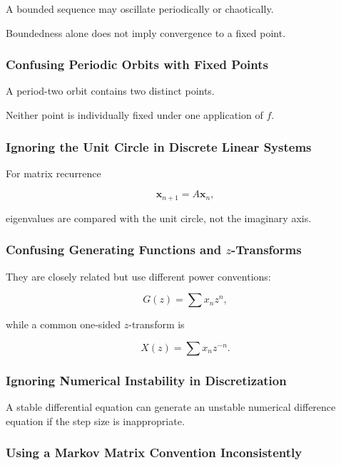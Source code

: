 A bounded sequence may oscillate periodically or chaotically.

Boundedness alone does not imply convergence to a fixed point.

\subsubsection{Confusing Periodic Orbits with Fixed Points}

A period-two orbit contains two distinct points.

Neither point is individually fixed under one application of \(f\).

\subsubsection{Ignoring the Unit Circle in Discrete Linear Systems}

For matrix recurrence

\[
\mathbf{x}_{n+1}=A\mathbf{x}_n,
\]

eigenvalues are compared with the unit circle, not the imaginary axis.

\subsubsection{Confusing Generating Functions and \(z\)-Transforms}

They are closely related but use different power conventions:

\[
G(z)
=
\sum x_nz^n,
\]

while a common one-sided \(z\)-transform is

\[
X(z)
=
\sum x_nz^{-n}.
\]

\subsubsection{Ignoring Numerical Instability in Discretization}

A stable differential equation can generate an unstable numerical
difference equation if the step size is inappropriate.

\subsubsection{Using a Markov Matrix Convention Inconsistently}

